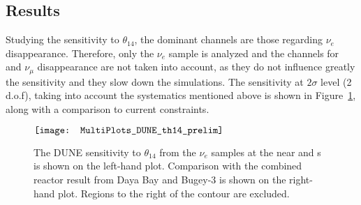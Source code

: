 \subsection{Results}
Studying the sensitivity to $\theta_{14}$, the dominant channels are those regarding $\nu_e$ disappearance. Therefore, only the $\nu_e$  sample is analyzed and the channels for  and $\nu_{\mu}$  disappearance are not taken into account, as they do not influence greatly the sensitivity and they slow down the simulations. The sensitivity at $2\sigma$ level (2 d.o.f), 
 taking into account the systematics mentioned above is shown in Figure~\ref{th_14}, along with a comparison to current constraints.
\begin{figure}
\centering
$\vcenter{\hbox{\texttt{[image: MultiPlots\_DUNE\_th14\_prelim]}}}$
\caption[Sensitivity to $\theta_{14}$ from the $\nu_e$  samples at near and s]{The DUNE sensitivity to $\theta_{14}$ from the $\nu_e$  samples at the near and s is shown on the left-hand plot. Comparison with the combined reactor result from Daya Bay and Bugey-3 is shown on the right-hand plot. Regions to the right of the contour are excluded.}
\label{th_14}
\end{figure}

